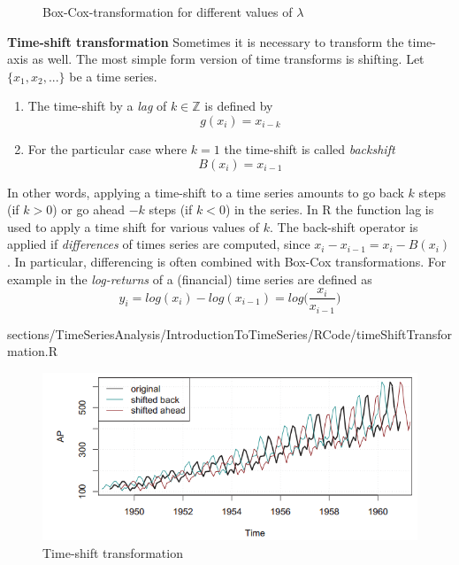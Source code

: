 {{\begin{figure}[H]
	\caption{Box-Cox-transformation for different values of $\lambda$}
	\label{Fig:boxCox}
\end{figure}
\RTheory
{\textbf{Time-shift transformation}\vfill
	Sometimes it is necessary to transform the time-axis as well. The most simple form version of time transforms is shifting.
	\vfill
	\hfill
	\break
	Let $\{x_1, x_2, . . . \}$ be a time series.
	\begin{enumerate}
	\item The time-shift by a \textit{lag} of $k \in \mathbb{Z}$ is defined by
	$$g(x_i)=x_{i-k} $$ 
	\item For the particular case where $k=1$ the time-shift is called \textit{backshift}
	$$ B(x_i)=x_{i-1}$$ 
	\end{enumerate}
	In other words, applying a time-shift to a time series amounts to go back $k$ steps (if $k>0$) or go ahead $-k$ steps (if $k<0$) in the series.
	\vfill
	\hfill
	\break
	In {\color{blue}R} the function {\color{blue}lag} is used to apply a time shift for various values of $k$.
\vfill
\hfill
\break
The back-shift operator is applied if \textit{differences} of times series are computed, since $x_i - x_{i-1}=x_i-B(x_i)$. In particular, differencing is often combined with Box-Cox
transformations. For example in the \textit{log-returns} of a (financial) time series are defined as
$$ y_i = log(x_i)-log(x_{i-1}) = log\bigg(\frac{x_i}{x_{i-1}}\bigg)$$

}
{sections/TimeSeriesAnalysis/IntroductionToTimeSeries/RCode/timeShiftTransformation.R}
\begin{figure}[H]\centering
	\includegraphics[width=0.7\linewidth]{images/timeShiftTrans.png}
	\caption{Time-shift transformation}
	\label{Fig:timeShiftTrans}
\end{figure}
}}
